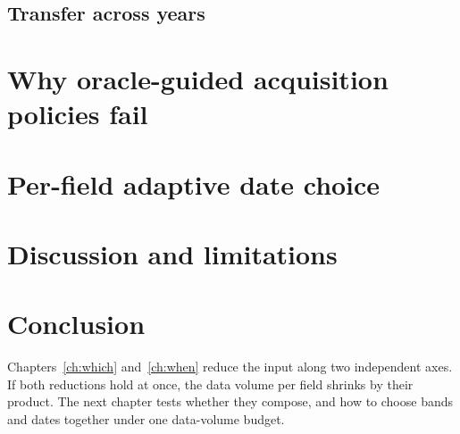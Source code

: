 \subsection{Transfer across years}

\section{Why oracle-guided acquisition policies fail}
\label{sec:when:oracle}

\section{Per-field adaptive date choice}

\section{Discussion and limitations}

\section{Conclusion}

\begin{bridge}
Chapters~\ref{ch:which} and~\ref{ch:when} reduce the input along two
independent axes. If both reductions hold at once, the data volume per field
shrinks by their product. The next chapter tests whether they compose, and
how to choose bands and dates together under one data-volume budget.
\end{bridge}
